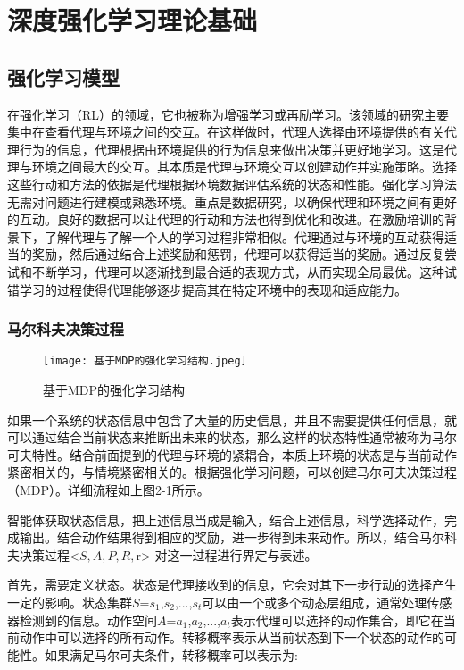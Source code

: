 \chapter{深度强化学习理论基础}

\section{强化学习模型}

在强化学习（RL）的领域，它也被称为增强学习或再励学习。该领域的研究主要集中在查看代理与环境之间的交互。在这样做时，代理人选择由环境提供的有关代理行为的信息，代理根据由环境提供的行为信息来做出决策并更好地学习。这是代理与环境之间最大的交互。其本质是代理与环境交互以创建动作并实施策略。选择这些行动和方法的依据是代理根据环境数据评估系统的状态和性能。强化学习算法无需对问题进行建模或熟悉环境。重点是数据研究，以确保代理和环境之间有更好的互动。良好的数据可以让代理的行动和方法也得到优化和改进。在激励培训的背景下，了解代理与了解一个人的学习过程非常相似。代理通过与环境的互动获得适当的奖励，然后通过结合上述奖励和惩罚，代理可以获得适当的奖励。通过反复尝试和不断学习，代理可以逐渐找到最合适的表现方式，从而实现全局最优。这种试错学习的过程使得代理能够逐步提高其在特定环境中的表现和适应能力。

\subsection{马尔科夫决策过程}


\begin{figure}[hbt]
	\centering
	\texttt{[image: 基于MDP的强化学习结构.jpeg]}
	\caption{基于MDP的强化学习结构}
	\label{f.example}
\end{figure}

如果一个系统的状态信息中包含了大量的历史信息，并且不需要提供任何信息，就可以通过结合当前状态来推断出未来的状态，那么这样的状态特性通常被称为马尔可夫特性。结合前面提到的代理与环境的紧耦合，本质上环境的状态是与当前动作紧密相关的，与情境紧密相关的。根据强化学习问题，可以创建马尔可夫决策过程（MDP）\cite{garcia2013markov}。详细流程如上图2-1所示。

智能体获取状态信息，把上述信息当成是输入，结合上述信息，科学选择动作，完成输出。结合动作结果得到相应的奖励，进一步得到未来动作。所以，结合马尔科夫决策过程<$S,A,P,R,$r>
对这一过程进行界定与表述。

首先，需要定义状态。状态是代理接收到的信息，它会对其下一步行动的选择产生一定的影响。状态集群$S$={${s_{1}}$,${s_{2}}$,...,${s_{t}}$}可以由一个或多个动态层组成，通常处理传感器检测到的信息。动作空间$A$={${a_{1}}$,${a_{2}}$,...,${a_{t}}$}表示代理可以选择的动作集合，即它在当前动作中可以选择的所有动作。转移概率表示从当前状态到下一个状态的动作的可能性。如果满足马尔可夫条件，转移概率可以表示为:

